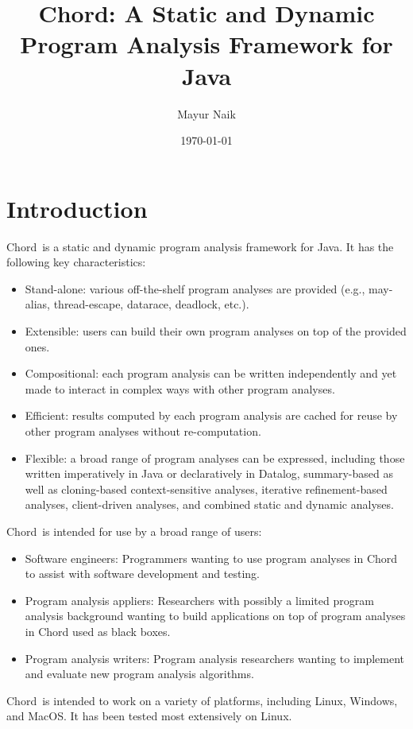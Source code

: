 \documentclass{article}
\title{Chord: A Static and Dynamic Program Analysis Framework for Java}
\author{Mayur Naik}
\date{\today}
\providecommand\Chord{Chord}
\begin{document}
\maketitle
\texonly{\tableofcontents}

\texonly{\newpage}
\section{Introduction}

\Chord\ is a static and dynamic program analysis framework for Java.
It has the following key characteristics:

\begin{itemize}
\item
Stand-alone: various off-the-shelf program analyses are provided (e.g., may-alias, thread-escape, datarace, deadlock, etc.).
\item
Extensible: users can build their own program analyses on top of the provided ones.
\item
Compositional: each program analysis can be written independently and yet made to interact in complex ways with other program analyses.
\item
Efficient: results computed by each program analysis are cached for reuse by other program analyses without re-computation.
\item
Flexible: a broad range of program analyses can be expressed, including those
written imperatively in Java or declaratively in Datalog, summary-based as well as cloning-based context-sensitive analyses,
iterative refinement-based analyses, client-driven analyses, and combined static and dynamic analyses.
\end{itemize}

\Chord\ is intended for use by a broad range of users:

\begin{itemize}
\item
Software engineers: Programmers wanting to use program analyses in Chord to assist with software development and testing.
\item
Program analysis appliers: Researchers with possibly a limited program analysis background wanting to build applications on top of program analyses in Chord used as black boxes.
\item
Program analysis writers: Program analysis researchers wanting to implement and evaluate new program analysis algorithms.
\end{itemize}

\Chord\ is intended to work on a variety of platforms, including Linux, Windows, and MacOS.
It has been tested most extensively on Linux.
\end{document}
